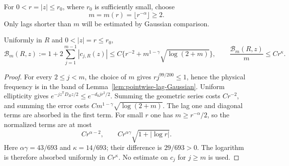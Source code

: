 For $0<r=|z|\le r_0$, where $r_0$ is sufficiently small, choose
\begin{equation}\label{eq:direct-memory-scale}
 m=m(r)=\lfloor r^{-\alpha}\rfloor\ge2.
\end{equation}
Only lags shorter than $m$ will be estimated by Gaussian comparison.

\begin{proposition}
\label{prop:short-lag-row-budget}
Uniformly in $R$ and $0<|z|=r\le r_0$,
\begin{equation}\label{eq:short-lag-row-budget}
 \mathcal B_m(R,z):=1+2\sum_{j=1}^{m-1}|c_{j,R}(z)|
  \le C\{r^{-2}+m^{1-\gamma}\sqrt{\log(2+m)}\},
 \qquad \frac{\mathcal B_m(R,z)}m\le Cr^\kappa.
\end{equation}
\end{proposition}
\begin{proof}
For every $2\le j<m$, the choice of $m$ gives
$rj^{99/200}\le1$, hence the physical frequency is in the band of
Lemma~\ref{lem:pointwise-lag-Gaussian}. Uniform ellipticity gives
$e^{-jz^{\mathsf T}D_Rz/2}\le e^{-d_0jr^2/2}$.
Summing the geometric series costs $Cr^{-2}$, and summing the error
costs $Cm^{1-\gamma}\sqrt{\log(2+m)}$. The lag one and diagonal
terms are absorbed in the first term. For small $r$ one has
$m\ge r^{-\alpha}/2$, so the normalized terms are at most
\[
 Cr^{\alpha-2},\qquad
 Cr^{\alpha\gamma}\sqrt{1+|\log r|}.
\]
Here $\alpha\gamma=43/693$ and $\kappa=14/693$; their difference is
$29/693>0$. The logarithm is therefore absorbed uniformly in
$Cr^\kappa$. No estimate on $c_j$ for $j\ge m$ is used.
\end{proof}

